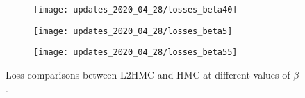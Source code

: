 
\begin{figure}[htpb!]
  \centering
  \begin{subfigure}[t]{0.57\textwidth}
    \texttt{[image: updates\_2020\_04\_28/losses\_beta40]}%
  \label{fig:losses_beta4}
  \end{subfigure}
  \begin{subfigure}[t]{0.57\textwidth}
    \texttt{[image: updates\_2020\_04\_28/losses\_beta5]}%
    \label{fig:losses_beta5}
  \end{subfigure}
  \begin{subfigure}[t]{0.57\textwidth}
    \texttt{[image: updates\_2020\_04\_28/losses\_beta55]}%
    \label{fig:losses_beta55}
  \end{subfigure}
  \caption{Loss comparisons between L2HMC and HMC at different values of
  \(\beta\).}
\end{figure}
